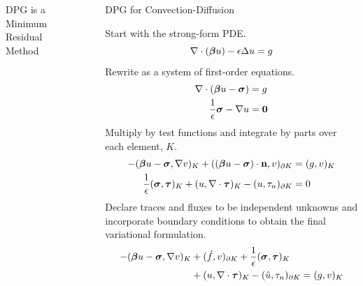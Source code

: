 \documentclass[final]{beamer}
\newlength{\sepwid}
\newlength{\onecolwid}
\begin{document}
\begin{frame}[t]
\begin{columns}[t]
\begin{column}{\onecolwid}
\begin{block}{DPG is a Minimum Residual Method}
\end{block}



\end{column} %

\begin{column}{\sepwid}\end{column} %

\begin{column}{\onecolwid} %


\begin{block}{DPG for Convection-Diffusion}

Start with the strong-form PDE.
\[
\nabla\cdot(\boldsymbol\beta u)-\epsilon\Delta u = g
\]
Rewrite as a system of first-order equations.
\begin{align*}
\nabla\cdot(\boldsymbol\beta u-\boldsymbol\sigma)&=g\\
\frac{1}{\epsilon}\boldsymbol\sigma-\nabla u&=\boldsymbol0
\end{align*}
Multiply by test functions and integrate by parts over each element, $K$.
\begin{align*}
-(\boldsymbol\beta u-\boldsymbol\sigma,\nabla v)_K+((\boldsymbol\beta
u-\boldsymbol\sigma)\cdot\mathbf{n},v)_{\partial K}&=(g,v)_K\\
\frac{1}{\epsilon}(\boldsymbol\sigma,\boldsymbol\tau)_K+(u,\nabla\cdot\boldsymbol\tau)_K
-(u,\tau_n)_{\partial K}&=0
\end{align*}
Declare traces and fluxes to be independent unknowns and incorporate boundary
conditions to obtain the final variational formulation.
\begin{align*}
-(\boldsymbol\beta u-\boldsymbol\sigma,\nabla v)_K&+(\hat f,v)_{\partial K}
+ \frac{1}{\epsilon}(\boldsymbol\sigma,\boldsymbol\tau)_K\\
&+(u,\nabla\cdot\boldsymbol\tau)_K
-(\hat u,\tau_n)_{\partial K}=(g,v)_K
\end{align*}

\end{block}



\end{column}
\end{columns}
\end{frame}
\end{document}
